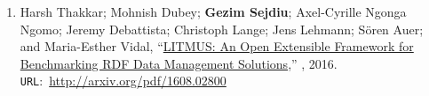 \begin{itemize}
\begin{enumerate}
    \item Harsh Thakkar; Mohnish Dubey; \textbf{Gezim Sejdiu}; Axel-Cyrille Ngonga Ngomo; Jeremy Debattista; Christoph Lange; Jens Lehmann; Sören Auer; and Maria-Esther Vidal, “\href{http://arxiv.org/pdf/1608.02800}{LITMUS: An Open Extensible Framework for Benchmarking RDF Data Management Solutions},” , 2016. \texttt{URL}:~\url{http://arxiv.org/pdf/1608.02800}

\end{enumerate}

\end{itemize}